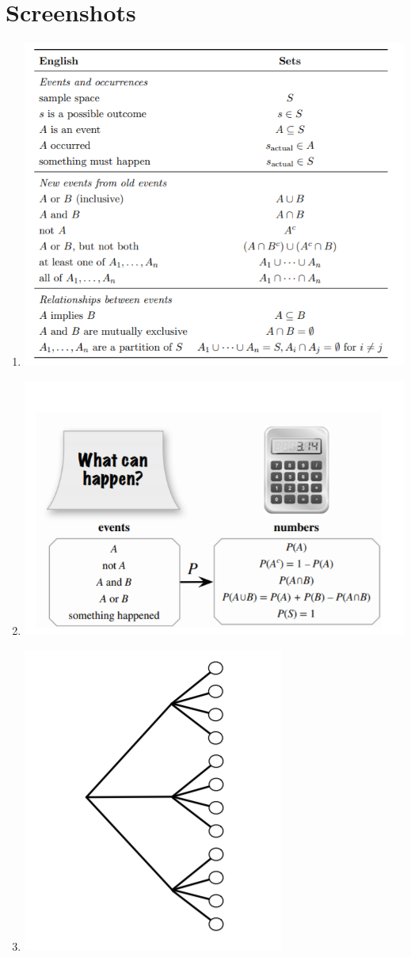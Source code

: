\documentclass[12pt, letterpaper]{article}
\begin{document}
\section{Screenshots}
\begin{enumerate}
    \item \includegraphics{English.png}
    \item \includegraphics{Happen.png}
    \item \includegraphics{Tree.png}
\end{enumerate}
\end{document}

